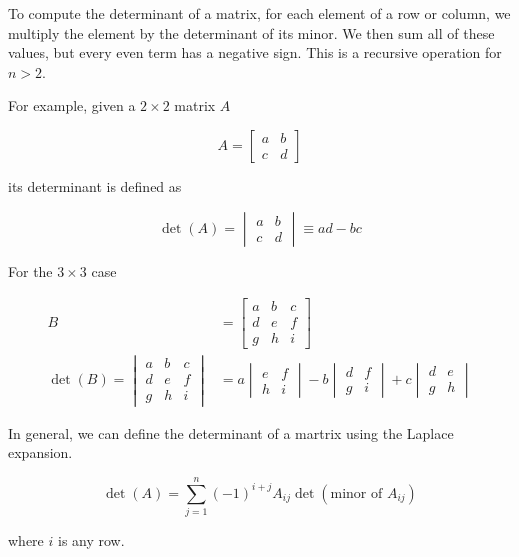 \documentclass{article}
\begin{document}
To compute the determinant of a matrix, for each element of a row or column, we multiply the element by the determinant of its minor.
We then sum all of these values, but every even term has a negative sign.
This is a recursive operation for \(n > 2\).

For example, given a \(2 \times 2\) matrix \(A\)

\[
    A=
    \begin{bmatrix}
        a & b \\
        c & d
    \end{bmatrix}
\]

its determinant is defined as

\[
    \det(A)=
    \begin{vmatrix}
        a & b \\
        c & d
    \end{vmatrix}
    \equiv ad-bc
\]

For the \(3 \times 3\) case

\begin{align*}
    B&=
    \begin{bmatrix}
        a & b & c \\
        d & e & f \\
        g & h & i
    \end{bmatrix}
    \\
    \det(B)=
    \begin{vmatrix}
        a & b & c \\
        d & e & f \\
        g & h & i
    \end{vmatrix}
    &=
    a \begin{vmatrix}
        e & f \\
        h & i
    \end{vmatrix}
    -b \begin{vmatrix}
        d & f \\
        g & i
    \end{vmatrix}
    +c \begin{vmatrix}
        d & e \\
        g & h
    \end{vmatrix}
\end{align*}

In general, we can define the determinant of a martrix using the Laplace expansion.

\[
    \det(A)=\sum_{j=1}^{n}{(-1)}^{i+j}A_{ij}\det(\text{minor of }A_{ij})
\]

where \(i\) is any row.
\end{document}
